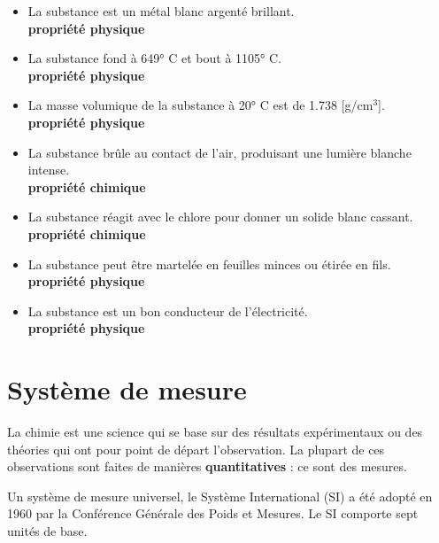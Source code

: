 \documentclass[
  11pt,
  a4paper,
  openany]{book}
\providecommand{\tightlist}{%
  \setlength{\itemsep}{0pt}\setlength{\parskip}{0pt}}
\begin{document}
\begin{Answer}

\begin{itemize}
\tightlist
\item
  La substance est un métal blanc argenté brillant.\\
  \textbf{propriété physique}
\item
  La substance fond à 649° C et bout à 1105° C.\\
  \textbf{propriété physique}
\item
  La masse volumique de la substance à 20° C est de 1.738 {[}g/cm\(^3\){]}.\\
  \textbf{propriété physique}
\item
  La substance brûle au contact de l'air, produisant une lumière blanche intense.\\
  \textbf{propriété chimique}
\item
  La substance réagit avec le chlore pour donner un solide blanc cassant.\\
  \textbf{propriété chimique}
\item
  La substance peut être martelée en feuilles minces ou étirée en fils.\\
  \textbf{propriété physique}
\item
  La substance est un bon conducteur de l'électricité.\\
  \textbf{propriété physique}
\end{itemize}

\end{Answer}

\clearpage

\hypertarget{systuxe8me-de-mesure}{%
\section{Système de mesure}\label{systuxe8me-de-mesure}}

La chimie est une science qui se base sur des résultats expérimentaux ou des théories qui ont pour point de départ l'observation. La plupart de ces observations sont faites de manières \textbf{quantitatives} : ce sont des mesures.

Un système de mesure universel, le Système International (SI) a été adopté en 1960 par la Conférence Générale des Poids et Mesures. Le SI comporte sept unités de base.
\end{document}
